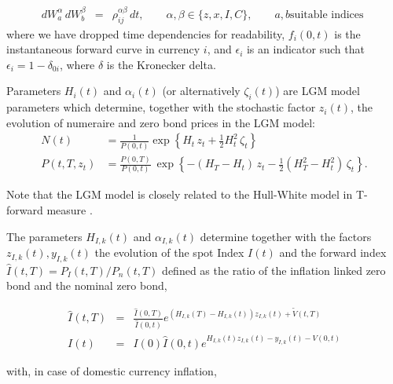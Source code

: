 \documentclass[12pt, a4paper]{article}
\begin{document}
{{\begin{appendix}
\begin{eqnarray*}
dW^\alpha_a\,dW^\beta_b &=& \rho^{\alpha\beta}_{ij}\,dt, \qquad \alpha, \beta \in \{z, x, I, C\}, \qquad a, b \text{
                              suitable indices }
\end{eqnarray*}
where we have dropped time dependencies for readability, $f_i(0,t)$ is the instantaneous forward curve in currency $i$, 
and $\epsilon_i$ is an indicator such that $\epsilon_i = 1 - \delta_{0i}$, where $\delta$ is the Kronecker delta.

\medskip Parameters $H_i(t)$ and $\alpha_i(t)$ (or alternatively $\zeta_i(t)$) are LGM model parameters which determine,
together with the stochastic factor $z_i(t)$, the evolution of numeraire and zero bond prices in the LGM model:
\begin{align}
N(t) &= \frac{1}{P(0,t)}\exp\left\{H_t\, z_t + \frac{1}{2}H^2_t\,\zeta_t \right\}
\label{lgm1f_numeraire} \\
P(t,T,z_t)
&= \frac{P(0,T)}{P(0,t)}\:\exp\left\{ -(H_T-H_t)\,z_t - \frac{1}{2} \left(H^2_T-H^2_t\right)\,\zeta_t\right\}.
\label{lgm1f_zerobond}
\end{align}

Note that the LGM model is closely related to the Hull-White model in T-forward measure \cite{Lichters}.

\medskip The parameters $H_{I,k}(t)$ and $\alpha_{I,k}(t)$ determine together with the factors $z_{I,k}(t), y_{I,k}(t)$
the evolution of the spot Index $I(t)$ and the forward index $\hat{I}(t,T) = P_I(t,T) / P_n(t,T)$ defined as the ratio
of the inflation linked zero bond and the nominal zero bond,

\begin{eqnarray*}
  \hat{I}(t,T) &=& \frac{\hat{I}(0,T)}{\hat{I}(0,t)} e^{(H_{I,k}(T)-H_{I,k}(t))z_{I,k}(t)+\tilde{V}(t,T)} \\
  I(t) &=& I(0) \hat{I}(0,t)e^{H_{I,k}(t)z_{I,k}(t)-y_{I,k}(t)-V(0,t)}
\end{eqnarray*}

with, in case of domestic currency inflation,


\end{appendix}}}
\end{document}
